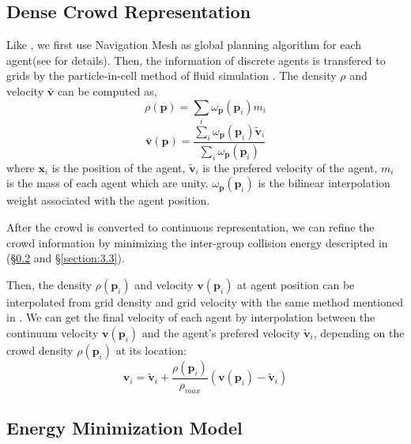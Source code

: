 \documentclass{egpubl}
\begin{document}
\subsection{Dense Crowd Representation}
\label{section:3.1}

Like \cite{Narain:2009}, we first use Navigation Mesh as global planning algorithm for each agent(see for details). Then, the information of discrete agents is transfered to grids by the particle-in-cell method of fluid simulation \cite{Narain:2009}. The density $\rho$ and velocity $\bar{\textbf{v}}$ can be computed as,
\begin{equation}
\label{eq:1}
 \rho(\textbf{p}) = \sum_{i} \omega_\textbf{p}(\textbf{p}_i)m_i
\end{equation}
\begin{equation}
\label{eq:2}
 \bar{\textbf{v}}(\textbf{p}) = \frac{\sum_{i} \omega_\textbf{p}(\textbf{p}_i)\tilde{\textbf{v}}_i}{\sum_{i} \omega_\textbf{p}(\textbf{p}_i)}
\end{equation} 
where $\textbf{x}_i$ is the position of the agent, $\tilde{\textbf{v}}_i$ is the prefered velocity of the agent, $m_i$ is the mass of each agent which are unity. $\omega_\textbf{p}(\textbf{p}_i)$ is the bilinear interpolation weight associated with the agent position.

After the crowd is converted to continuous representation, we can refine the crowd information by minimizing the inter-group collision energy descripted in (\S\ref{section:3.2} and \S\ref{section:3.3}).

Then, the density $\rho(\textbf{p}_i)$ and velocity $\textbf{v}(\textbf{p}_i)$ at agent position can be interpolated from grid density and grid velocity with the same method mentioned in \cite{Treuille:2006}. We can get the final velocity of each agent by interpolation between the continuum velocity $\textbf{v}(\textbf{p}_i)$ and the agent's prefered velocity $\tilde{\textbf{v}}_i$, depending on the crowd density $\rho(\textbf{p}_i)$ at its location:
\begin{equation}
\label{eq:3}
\textbf{v}_i = \tilde{\textbf{v}}_i + \frac{\rho(\textbf{p}_i)}{\rho_{max}}(\textbf{v}(\textbf{p}_i) - \tilde{\textbf{v}}_i)
\end{equation}

\subsection{Energy Minimization Model}
\label{section:3.2}
\end{document}
